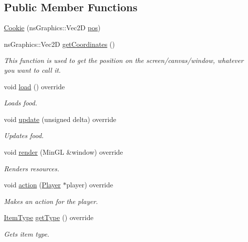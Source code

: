 \subsection*{Public Member Functions}
\begin{DoxyCompactItemize}
\item 
\hyperlink{classns_game_1_1_cookie_a2e6c34dfd2892c48dc4ce2b503504674}{Cookie} (ns\+Graphics\+::\+Vec2D \hyperlink{structns_game_1_1_item_a5518876a13f3d2eda659d29748097f1a}{pos})
\item 
ns\+Graphics\+::\+Vec2D \hyperlink{classns_game_1_1_cookie_ab624101d018f74fb856bdfd7fd97c55e}{get\+Coordinates} ()
\begin{DoxyCompactList}\small\item\em This function is used to get the position on the screen/canvas/window, whatever you want to call it. \end{DoxyCompactList}\item 
void \hyperlink{classns_game_1_1_cookie_a20769adf2b327f4bf519e851073b1891}{load} () override
\begin{DoxyCompactList}\small\item\em Loads food. \end{DoxyCompactList}\item 
void \hyperlink{classns_game_1_1_cookie_aaea5c3967effe908f2676a5ded17aa39}{update} (unsigned delta) override
\begin{DoxyCompactList}\small\item\em Updates food. \end{DoxyCompactList}\item 
void \hyperlink{classns_game_1_1_cookie_a7e321497bf9d9baa738d987e9c47dd5e}{render} (Min\+GL \&window) override
\begin{DoxyCompactList}\small\item\em Renders resources. \end{DoxyCompactList}\item 
void \hyperlink{classns_game_1_1_cookie_a2cd4ee8c83b99191643d6e9ef2267b1a}{action} (\hyperlink{classns_game_1_1_player}{Player} $\ast$player) override
\begin{DoxyCompactList}\small\item\em Makes an action for the player. \end{DoxyCompactList}\item 
\hyperlink{namespacens_game_a5f7db01e6447720e9a145f0b3c68a4d7}{Item\+Type} \hyperlink{classns_game_1_1_cookie_ac5c28f610947708bc1f31b1e8a88ef42}{get\+Type} () override
\begin{DoxyCompactList}\small\item\em Gets item type. \end{DoxyCompactList}\end{DoxyCompactItemize}
